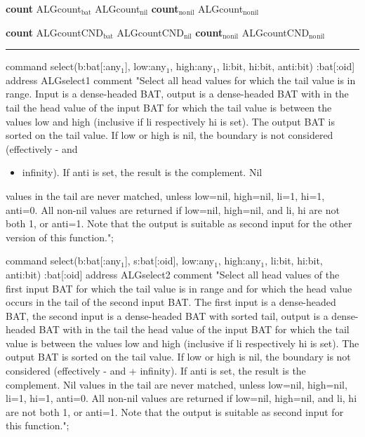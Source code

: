 \documentclass[11pt]{article}
\begin{document}
\textbf{count}
ALGcount\(_{\text{bat}}\)
ALGcount\(_{\text{nil}}\)
\textbf{count\(_{\text{no}}\)\(_{\text{nil}}\)}
ALGcount\(_{\text{no}}\)\(_{\text{nil}}\)

\textbf{count}
ALGcountCND\(_{\text{bat}}\)
ALGcountCND\(_{\text{nil}}\)
\textbf{count\(_{\text{no}}\)\(_{\text{nil}}\)}
ALGcountCND\(_{\text{no}}\)\(_{\text{nil}}\)


\noindent\rule{\textwidth}{0.5pt}

command select(b:bat[:any\(_{\text{1}}\)], low:any\(_{\text{1}}\), high:any\(_{\text{1}}\), li:bit, hi:bit, anti:bit) :bat[:oid]
address ALGselect1
comment "Select all head values for which the tail value is in range.
	Input is a dense-headed BAT, output is a dense-headed BAT with in
	the tail the head value of the input BAT for which the tail value
	is between the values low and high (inclusive if li respectively
	hi is set).  The output BAT is sorted on the tail value.  If low
	or high is nil, the boundary is not considered (effectively - and
\begin{itemize}
\item infinity).  If anti is set, the result is the complement.  Nil
\end{itemize}
values in the tail are never matched, unless low=nil, high=nil,
li=1, hi=1, anti=0.  All non-nil values are returned if low=nil,
high=nil, and li, hi are not both 1, or anti=1.
Note that the output is suitable as second input for the other
version of this function.";

command select(b:bat[:any\(_{\text{1}}\)], s:bat[:oid], low:any\(_{\text{1}}\), high:any\(_{\text{1}}\), li:bit, hi:bit, anti:bit) :bat[:oid]
address ALGselect2
comment "Select all head values of the first input BAT for which the tail value
	is in range and for which the head value occurs in the tail of the
	second input BAT.
	The first input is a dense-headed BAT, the second input is a
	dense-headed BAT with sorted tail, output is a dense-headed BAT
	with in the tail the head value of the input BAT for which the
	tail value is between the values low and high (inclusive if li
	respectively hi is set).  The output BAT is sorted on the tail
	value.  If low or high is nil, the boundary is not considered
	(effectively - and + infinity).  If anti is set, the result is the
	complement.  Nil values in the tail are never matched, unless
	low=nil, high=nil, li=1, hi=1, anti=0.  All non-nil values are
	returned if low=nil, high=nil, and li, hi are not both 1, or anti=1.
	Note that the output is suitable as second input for this
	function.";
\end{document}
